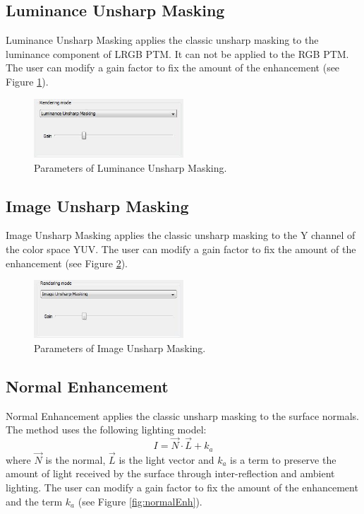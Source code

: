 \documentclass[oneside, 11pt]{book}
\begin{document}
\subsection{Luminance Unsharp Masking}
Luminance Unsharp Masking applies the classic unsharp masking to the luminance component of LRGB PTM. It can not be applied to the RGB PTM. The user can modify a gain factor to fix the amount of the enhancement (see Figure \ref{fig:luminanceUM}).

\begin{figure}[hbt]
  \centering
  \includegraphics[width=0.5\textwidth]{luminance_um}
  \caption{Parameters of Luminance Unsharp Masking.}
  \label{fig:luminanceUM}
\end{figure}

\subsection{Image Unsharp Masking}
Image Unsharp Masking applies the classic unsharp masking to the Y channel of the color space YUV. The user can modify a gain factor to fix the amount of the enhancement (see Figure \ref{fig:imageUM}).

\begin{figure}[hbt]
  \centering
  \includegraphics[width=0.5\textwidth]{image_um}
  \caption{Parameters of Image Unsharp Masking.}
  \label{fig:imageUM}
\end{figure}

\subsection{Normal Enhancement}
Normal Enhancement applies the classic unsharp masking to the surface normals. The method uses the following lighting model:
\begin{equation}
    I = \vec{N} \cdot \vec{L} + k_{a}
\end{equation}
where $\vec{N}$ is the normal, $\vec{L}$ is the light vector and $k_{a}$ is a term to preserve the amount of light received by the surface through inter-reflection and ambient lighting. The user can modify a gain factor to fix the amount of the enhancement and the term $k_{a}$ (see Figure \ref{fig:normalEnh}).
\end{document}
